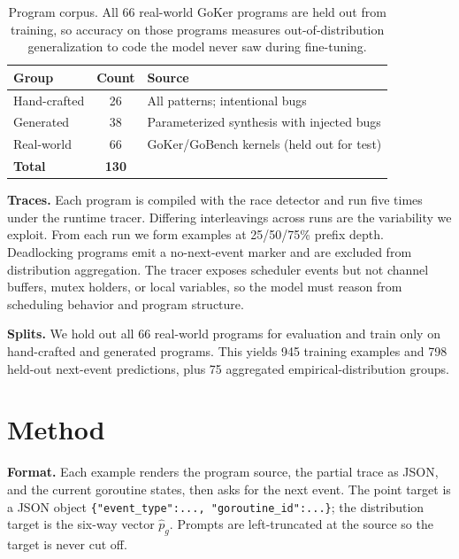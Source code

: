 \documentclass{svproc}
\begin{document}
\begin{table}[t]
\centering
\caption{Program corpus. All 66 real-world GoKer programs are held out
from training, so accuracy on those programs measures out-of-distribution
generalization to code the model never saw during fine-tuning.}
\label{tab:corpus}
\small
\begin{tabular}{lcl}
\toprule
\textbf{Group} & \textbf{Count} & \textbf{Source}\\
\midrule
Hand-crafted & 26 & All patterns; intentional bugs\\
Generated    & 38 & Parameterized synthesis with injected bugs\\
Real-world   & 66 & GoKer/GoBench kernels (held out for test)\\
\midrule
\textbf{Total} & \textbf{130} & \\
\bottomrule
\end{tabular}
\end{table}

\textbf{Traces.}
Each program is compiled with the race detector and run five times under
the runtime tracer. Differing interleavings across runs are the
variability we exploit. From each run we form examples at 25/50/75\%
prefix depth. Deadlocking programs emit a no-next-event marker and are
excluded from distribution aggregation. The tracer exposes scheduler
events but not channel buffers, mutex holders, or local variables, so
the model must reason from scheduling behavior and program structure.

\textbf{Splits.}
We hold out all 66 real-world programs for evaluation and train only on
hand-crafted and generated programs. This yields 945 training examples
and 798 held-out next-event predictions, plus 75 aggregated
empirical-distribution groups.

\section{Method}\label{sec:method}

\textbf{Format.}
Each example renders the program source, the partial trace as JSON, and
the current goroutine states, then asks for the next event. The point
target is a JSON object \texttt{\{"event\_type":..., "goroutine\_id":...\}};
the distribution target is the six-way vector $\hat p_g$. Prompts are
left-truncated at the source so the target is never cut off.
\end{document}
